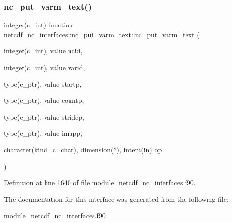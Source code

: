 \subsubsection{\texorpdfstring{nc\+\_\+put\+\_\+varm\+\_\+text()}{nc\_put\_varm\_text()}}
{\footnotesize\ttfamily integer(c\+\_\+int) function netcdf\+\_\+nc\+\_\+interfaces\+::nc\+\_\+put\+\_\+varm\+\_\+text\+::nc\+\_\+put\+\_\+varm\+\_\+text (\begin{DoxyParamCaption}\item[{integer(c\+\_\+int), value}]{ncid,  }\item[{integer(c\+\_\+int), value}]{varid,  }\item[{type(c\+\_\+ptr), value}]{startp,  }\item[{type(c\+\_\+ptr), value}]{countp,  }\item[{type(c\+\_\+ptr), value}]{stridep,  }\item[{type(c\+\_\+ptr), value}]{imapp,  }\item[{character(kind=c\+\_\+char), dimension($\ast$), intent(in)}]{op }\end{DoxyParamCaption})}



Definition at line 1640 of file module\+\_\+netcdf\+\_\+nc\+\_\+interfaces.\+f90.



The documentation for this interface was generated from the following file\+:\begin{DoxyCompactItemize}
\item 
\hyperlink{module__netcdf__nc__interfaces_8f90}{module\+\_\+netcdf\+\_\+nc\+\_\+interfaces.\+f90}\end{DoxyCompactItemize}
